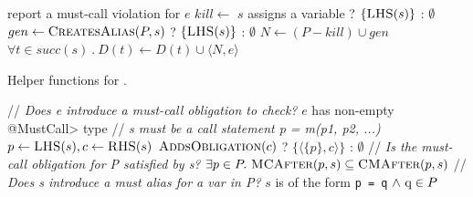\begin{algorithm}[t]
\begin{algorithmic}[1]
     \label{li:end-scope}
      \State report a must-call violation for $e$
     \label{li:check-satisfied}
    \State $kill \gets $ $s$ assigns a variable ? $\{\textsc{LHS}(s)\}$ : $\emptyset$ \label{li:compute-kill}
    \State $gen \gets \textsc{CreatesAlias}(P,s)$ ? $\{\textsc{LHS}(s)\}$ : $\emptyset$ \label{li:compute-gen} 
    \State $N \gets (P - kill) \cup gen$ \label{li:compute-new-mc-aliases}
    \State $\forall t \in \mathit{succ}(s)\ .\ D(t) \leftarrow D(t) \cup \langle
    N, e \rangle$ \label{li:prop-to-succs}
    \EndIf
    \EndFor
  \EndWhile \label{li:alg-loop-end}
  \EndProcedure
  \end{algorithmic}
\end{algorithm}

\begin{algorithm}[h]
  \caption{Helper functions for . 
}
  \label{alg:helpers}
  \begin{algorithmic}[1]
  \State // \textit{Does e introduce a must-call obligation to check?}
  \State \Return $e$ has non-empty \<@MustCall> type
  \EndProcedure
  \State // \textit{s must be a call statement p = m(p1, p2, ...)}
  \State $p \gets \textsc{LHS}(s), c \gets \textsc{RHS}(s)$
  \State \Return $\textsc{AddsObligation}(c)$ ? $\{ \langle \{ p \}, c
  \rangle \}$ : $\emptyset$
  \EndProcedure
  \State // \textit{Is the must-call obligation for P satisfied by
    s?}
  \State \Return $\exists p \in P .\ \textsc{MCAfter}(p,s) \subseteq \textsc{CMAfter}(p,s)$
  \EndProcedure
  \State // \textit{Does s introduce a must alias for a var in P?}
    \State \Return $s$ is of the form \lstinline{p = q} $\wedge\ \lstinline{q} \in P$
  \EndProcedure
  \end{algorithmic}

\end{algorithm}

